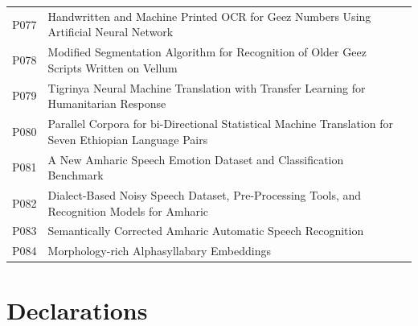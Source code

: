 \documentclass[sn-mathphys-num]{sn-jnl}
\theoremstyle{thmstyleone}
\theoremstyle{thmstyletwo}
\theoremstyle{thmstylethree}
\begin{document}
\begin{appendices}
\begin{longtable}{@{}p{1.1cm}p{8.5cm}p{2.3cm}@{}}
P077 & Handwritten and Machine Printed OCR for Geez Numbers Using Artificial Neural Network & \citep{beyene_handwritten_2019} \\
P078 & Modified Segmentation Algorithm for Recognition of Older Geez Scripts Written on Vellum & \citep{negashe_modified_2020} \\
P079 & Tigrinya Neural Machine Translation with Transfer Learning for Humanitarian Response & \citep{oktem_tigrinya_2020} \\
P080 & Parallel Corpora for bi-Directional Statistical Machine Translation for Seven Ethiopian Language Pairs & \citep{teferra_abate_parallel_2018} \\
P081 & A New Amharic Speech Emotion Dataset and Classification Benchmark & \citep{retta_new_2023} \\
P082 & Dialect-Based Noisy Speech Dataset, Pre-Processing Tools, and Recognition Models for Amharic & \citep{assfaw_dialectbased_2022} \\
P083 & Semantically Corrected Amharic Automatic Speech Recognition & \citep{adnew_semantically_2024} \\
P084 & Morphology-rich Alphasyllabary Embeddings & \citep{mersha_morphologyrich_2020} \\
\end{longtable}

\end{appendices}

\section*{Declarations}
\end{document}
